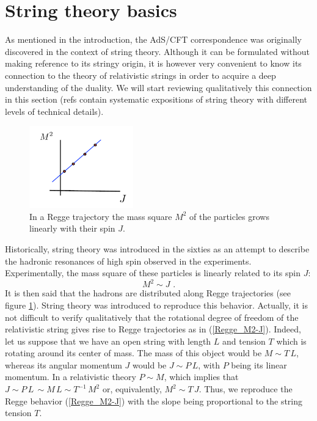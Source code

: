 \documentclass[12pt,notitlepage]{article}
\newcommand{\beq}{\begin{equation}}
\newcommand{\eeq}{\end{equation}}
\begin{document}
\section{String theory basics}

As mentioned in the introduction, the AdS/CFT correspondence was originally discovered in the context of string theory. Although it can be formulated without making reference to its stringy origin, it is however very convenient to know its connection to the theory of relativistic strings in order to acquire a deep understanding of the duality. We will start reviewing qualitatively this connection in this section (refs \cite{GSW, Polchinski,BBM, Elias, Zwiebach,Ibanez_Uranga}  contain systematic expositions of string theory with different levels of technical details). 

\begin{figure}[ht]
\center
\includegraphics[width=0.4\textwidth]{Regge-trajectory.pdf}
\caption{In a Regge trajectory the mass square $M^2$ of the particles grows linearly with their spin $J$. } 
\label{Regge-trajectory}
\end{figure}





Historically, string theory was introduced in the sixties as an attempt to describe the hadronic resonances of high spin observed in the experiments. Experimentally, the mass square of these particles is linearly related to its spin $J$:
\beq
M^2\sim J\,\,.
\label{Regge_M2-J}
\eeq
It is  then said that the hadrons are distributed along Regge trajectories (see figure \ref{Regge-trajectory}). String theory was introduced to reproduce this behavior. Actually, it is not difficult to verify qualitatively that the rotational degree of freedom of the relativistic string gives rise to Regge trajectories  as in (\ref{Regge_M2-J}). Indeed, let us suppose that we have an open string with length $L$ and tension $T$ which is rotating around its center of mass. The mass of this object would be 
$M\sim T\,L$, whereas its angular momentum $J$ would be $J\sim P\,L$, with $P$ being its linear momentum. In a relativistic theory $P\sim M$, which implies that 
$J\sim P\,L\,\sim M\,L\sim T^{-1}\,M^2$ or, equivalently, $M^2\sim T\,J$. Thus, we reproduce the Regge behavior (\ref{Regge_M2-J}) with the slope being proportional to the string tension $T$. 
\end{document}
